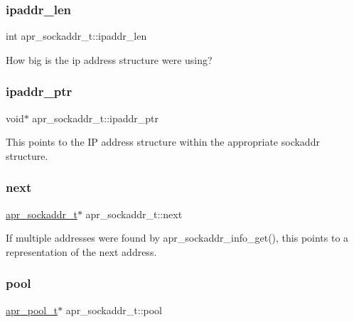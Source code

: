 \subsubsection{\texorpdfstring{ipaddr\+\_\+len}{ipaddr\_len}}
{\footnotesize\ttfamily int apr\+\_\+sockaddr\+\_\+t\+::ipaddr\+\_\+len}

How big is the ip address structure we\textquotesingle{}re using? \mbox{\label{structapr__sockaddr__t_a6e1b71121ada4047acde36c6777b5442}} 
\subsubsection{\texorpdfstring{ipaddr\+\_\+ptr}{ipaddr\_ptr}}
{\footnotesize\ttfamily void$\ast$ apr\+\_\+sockaddr\+\_\+t\+::ipaddr\+\_\+ptr}

This points to the IP address structure within the appropriate sockaddr structure. \mbox{\label{structapr__sockaddr__t_a774835c6b8e3adf255b752e8b126c434}} 
\subsubsection{\texorpdfstring{next}{next}}
{\footnotesize\ttfamily \mbox{\hyperlink{structapr__sockaddr__t}{apr\+\_\+sockaddr\+\_\+t}}$\ast$ apr\+\_\+sockaddr\+\_\+t\+::next}

If multiple addresses were found by apr\+\_\+sockaddr\+\_\+info\+\_\+get(), this points to a representation of the next address. \mbox{\label{structapr__sockaddr__t_a5f2d72a6a181cf2f54ba7c922aa0dfab}} 
\subsubsection{\texorpdfstring{pool}{pool}}
{\footnotesize\ttfamily \mbox{\hyperlink{group__apr__pools_gaf137f28edcf9a086cd6bc36c20d7cdfb}{apr\+\_\+pool\+\_\+t}}$\ast$ apr\+\_\+sockaddr\+\_\+t\+::pool}

